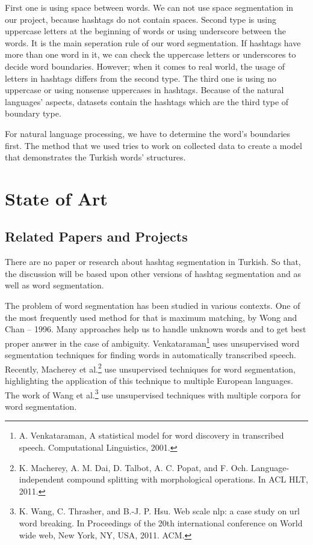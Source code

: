 \documentclass[12pt]{comjnl}
\begin{document}
First one is using space between words. We can not use space segmentation in our project, because hashtags do not contain spaces. 
Second type is using uppercase letters at the beginning of words or using underscore between the words. It is the main seperation rule of our word segmentation. If hashtags have more than one word in it, we can check the uppercase letters or underscores to decide word boundaries. However; when it comes to real world, the usage of letters in hashtags differs from the second type.
The third one is using no uppercase or using nonsense uppercases in hashtags. Because of the natural languages' aspects, datasets contain the hashtags which are the third type of boundary type.

For natural language processing, we have to determine the word's boundaries first. The method that we used tries to work on collected data to create a model that demonstrates the Turkish words' structures.

\section{State of Art}
\subsection{Related Papers and Projects}
There are no paper or research about hashtag segmentation in Turkish. So that, the discussion will be based upon other versions of hashtag segmentation and as well as word segmentation.

The problem of word segmentation has been studied in
various contexts. 
One of the most frequently used method for that is maximum matching, by Wong and Chan – 1996. Many approaches help us to handle unknown words and to get best proper answer in the case of ambiguity.
Venkataraman\footnote{A. Venkataraman, A statistical model for word
discovery in transcribed speech. Computational Linguistics, 2001.} 
uses unsupervised word segmentation techniques for finding words in automatically
transcribed speech. Recently, Macherey et al.\footnote{ K. Macherey, A. M. Dai, D. Talbot, A. C. Popat, and
F. Och. Language-independent compound splitting with morphological operations. In ACL HLT, 2011.} 
use unsupervised techniques for word segmentation, highlighting
the application of this technique to multiple European languages.
The work of Wang et al.\footnote{K. Wang, C. Thrasher, and B.-J. P. Hsu. Web scale
nlp: a case study on url word breaking. In Proceedings of the 20th international conference on World wide web, New York, NY, USA, 2011. ACM.}
use unsupervised techniques with multiple corpora for word segmentation.
\end{document}
